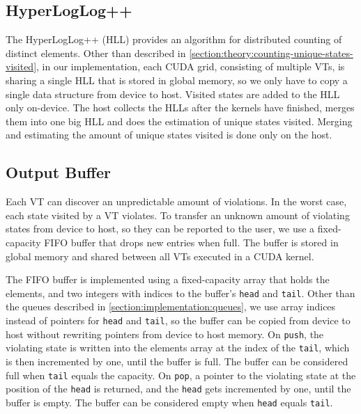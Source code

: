 \documentclass[
fancyheadings, %
%
%
]{stsreprt}
\begin{document}
\subsection{HyperLogLog++}

The HyperLogLog++ (HLL) provides an algorithm for distributed counting of distinct elements.
Other than described in \cref{section:theory:counting-unique-states-visited}, in our implementation, each CUDA grid, consisting of multiple VTs, is sharing a single HLL that is stored in global memory, so we only have to copy a single data structure from device to host.
Visited states are added to the HLL only on-device.
The host collects the HLLs after the kernels have finished, merges them into one big HLL and does the estimation of unique states visited.
Merging and estimating the amount of unique states visited is done only on the host.

\subsection{Output Buffer}
\label{section:implementation:output-buffer}

Each VT can discover an unpredictable amount of violations.
In the worst case, each state visited by a VT violates.
To transfer an unknown amount of violating states from device to host, so they can be reported to the user, we use a fixed-capacity FIFO buffer that drops new entries when full.
The buffer is stored in global memory and shared between all VTs executed in a CUDA kernel.

The FIFO buffer is implemented using a fixed-capacity array that holds the elements, and two integers with indices to the buffer's \texttt{head} and \texttt{tail}.
Other than the queues described in \cref{section:implementation:queues}, we use array indices instead of pointers for \texttt{head} and \texttt{tail}, so the buffer can be copied from device to host without rewriting pointers from device to host memory.
On \texttt{push}, the violating state is written into the elements array at the index of the \texttt{tail}, which is then incremented by one, until the buffer is full.
The buffer can be considered full when \texttt{tail} equals the capacity.
On \texttt{pop}, a pointer to the violating state at the position of the \texttt{head} is returned, and the \texttt{head} gets incremented by one, until the buffer is empty.
The buffer can be considered empty when \texttt{head} equals \texttt{tail}.
\end{document}
